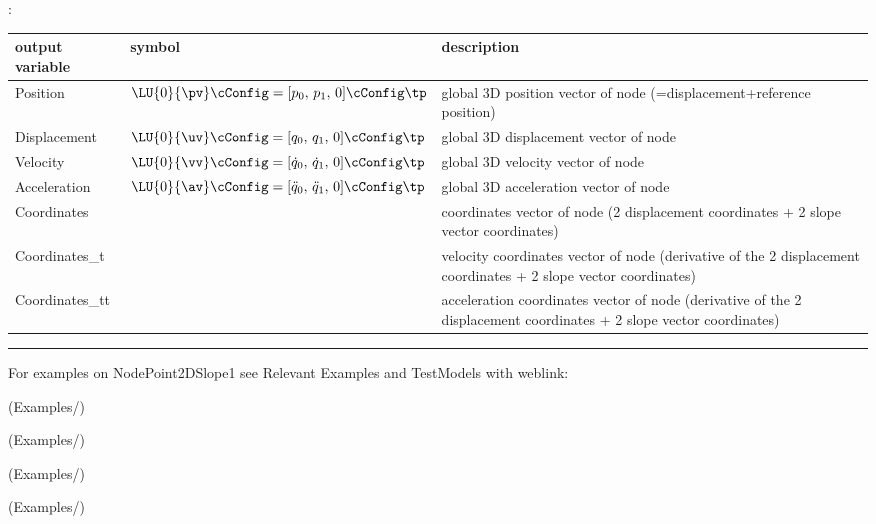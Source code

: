 :
\begin{center}
\footnotesize
\begin{longtable}{| p{5cm} | p{5cm} | p{6cm} |} 
\hline
\bf output variable & \bf symbol & \bf description \\ \hline
Position & $\LU{0}{\pv}\cConfig = [p_0,\, p_1,\,0]\cConfig\tp$ & global 3D position vector of node (=displacement+reference position)\\ \hline
Displacement & $\LU{0}{\uv}\cConfig = [q_0,\, q_1,\,0]\cConfig\tp$ & global 3D displacement vector of node\\ \hline
Velocity & $\LU{0}{\vv}\cConfig = [\dot q_0,\,\dot q_1,\,0]\cConfig\tp$ & global 3D velocity vector of node\\ \hline
Acceleration & $\LU{0}{\av}\cConfig = [\ddot q_0,\,\ddot q_1,\,0]\cConfig\tp$ & global 3D acceleration vector of node\\ \hline
Coordinates &  & coordinates vector of node (2 displacement coordinates + 2 slope vector coordinates)\\ \hline
Coordinates\_t &  & velocity coordinates vector of node (derivative of the 2 displacement coordinates + 2 slope vector coordinates)\\ \hline
Coordinates\_tt &  & acceleration coordinates vector of node (derivative of the 2 displacement coordinates + 2 slope vector coordinates)\\ \hline
\end{longtable}
\end{center}
\vspace{6pt}\par\noindent\rule{\textwidth}{0.4pt}
%
\noindent For examples on NodePoint2DSlope1 see Relevant Examples and TestModels with weblink:
\bi
\item {} (Examples/)
\item {} (Examples/)
\item {} (Examples/)
\item {} (Examples/)
